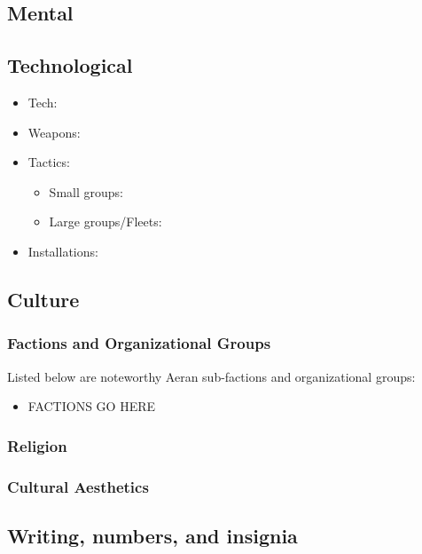 
\subsection{Mental}


\subsection{Technological}
\begin{itemize}
\item Tech: 


\item Weapons:

\item Tactics:
\begin{itemize}
\item    Small groups: 
\item    Large groups/Fleets: 
\end{itemize}


\item Installations:


\end{itemize}

\subsection{Culture}

\subsubsection{Factions and Organizational Groups}
Listed below are noteworthy Aeran sub-factions and organizational groups: 
\begin{itemize}
\item FACTIONS GO HERE
\end{itemize}

\subsubsection{Religion}

\subsubsection{Cultural Aesthetics}

\subsection{Writing, numbers, and insignia}

